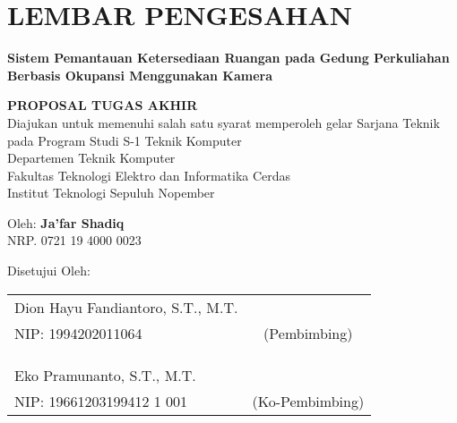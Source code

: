 \chapter*{LEMBAR PENGESAHAN}

\thispagestyle{empty}

\begin{center}
  \textbf{Sistem Pemantauan Ketersediaan Ruangan pada Gedung Perkuliahan Berbasis Okupansi Menggunakan Kamera}
\end{center}

\begingroup
\small

\begin{center}
  \textbf{PROPOSAL TUGAS AKHIR} \\
  Diajukan untuk memenuhi salah satu syarat memperoleh gelar
  Sarjana Teknik pada
  Program Studi S-1 Teknik Komputer \\
  Departemen Teknik Komputer \\
  Fakultas Teknologi Elektro dan Informatika Cerdas \\
  Institut Teknologi Sepuluh Nopember
\end{center}

\begin{center}
  Oleh: \textbf{Ja'far Shadiq} \\
  NRP. 0721 19 4000 0023
\end{center}

\begin{center}
  Disetujui Oleh:
\end{center}

\vspace{10ex}

\begingroup
\setlength{\tabcolsep}{0pt}

\noindent
\begin{tabularx}{\textwidth}{X c}
  Dion Hayu Fandiantoro, S.T., M.T.      &                 \\
  NIP: 1994202011064    & (Pembimbing)    \\
                                &                 \\
                                &                 \\
                                &                 \\
  Eko Pramunanto, S.T., M.T. &                 \\
  NIP: 19661203199412 1 001    & (Ko-Pembimbing) \\
\end{tabularx}
\endgroup

